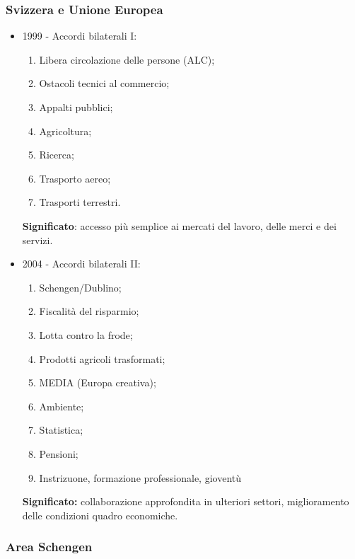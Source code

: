 \documentclass{article}
\begin{document}
\subsubsection{Svizzera e Unione Europea}
\begin{itemize}
    \item 1999 - Accordi bilaterali I:
        \begin{enumerate}
            \item Libera circolazione delle persone (ALC);
            \item Ostacoli tecnici al commercio;
            \item Appalti pubblici;
            \item Agricoltura;
            \item Ricerca;
            \item Trasporto aereo;
            \item Trasporti terrestri.
        \end{enumerate}
        \textbf{Significato}: accesso più semplice ai mercati del lavoro, delle merci e dei
        servizi.
    \item 2004 - Accordi bilaterali II:
        \begin{enumerate}
            \item Schengen/Dublino;
            \item Fiscalità del risparmio;
            \item Lotta contro la frode;
            \item Prodotti agricoli trasformati;
            \item MEDIA (Europa creativa);
            \item Ambiente;
            \item Statistica;
            \item Pensioni;
            \item Instrizuone, formazione professionale, gioventù
        \end{enumerate}
        \textbf{Significato:} collaborazione approfondita in ulteriori settori, miglioramento
        delle condizioni quadro economiche.
    \end{itemize}

\subsubsection{Area Schengen}
\end{document}
